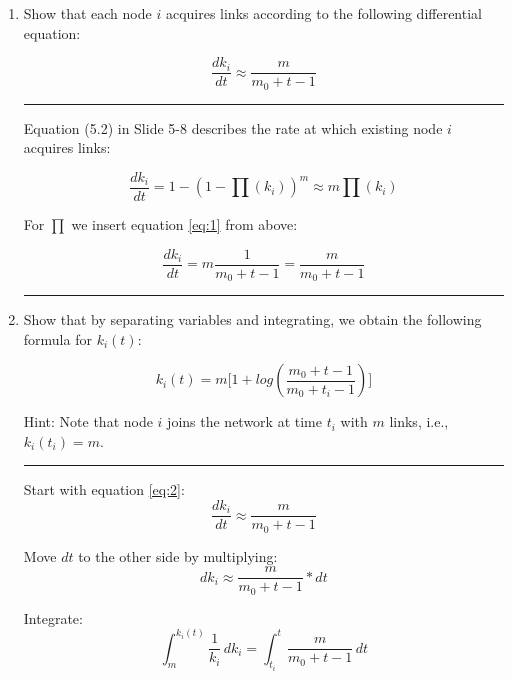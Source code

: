 \begin{enumerate}
	\item Show that each node $i$ acquires links according to the following differential equation:
	
	\begin{equation}  \label{eq:2}
		\frac{dk_i}{dt} \approx \frac{m}{m_0 + t - 1}
	\end{equation}
	
	\hrule \relax
	
	Equation (5.2) in Slide 5-8 describes the rate at which existing node $i$ acquires links:
	
	\begin{equation}
		\frac{dk_i}{dt} = 1 - (1 - \prod(k_i))^m \approx m \prod(k_i)
	\end{equation}
	
	For $\prod$ we insert equation \ref{eq:1} from above:
	
	\begin{equation}
		\frac{dk_i}{dt} = m \frac{1}{m_0 + t - 1} = \frac{m}{m_0 + t - 1}
	\end{equation}
	
	\hrule \relax
	
	\item Show that by separating variables and integrating, we obtain the following formula for $k_i(t)$:
	
	\begin{equation} \label{eq:3}
		k_i(t) = m \biggl[1 + log(\frac{m_0 + t - 1}{m_0 + t_i - 1}) \biggr]
	\end{equation}
	
	Hint: Note that node $i$ joins the network at time $t_i$ with $m$ links, i.e., $k_i(t_i) = m$.
	
	\hrule \relax
	
	Start with equation \ref{eq:2}:
	\begin{equation*}
		\frac{dk_i}{dt} \approx \frac{m}{m_0 + t - 1}
	\end{equation*}
	
	Move $dt$ to the other side by multiplying:
	\begin{equation*}
		dk_i \approx \frac{m}{m_0 + t - 1} * dt
	\end{equation*}
	
	Integrate:
	\begin{equation*}
		\int_{m}^{k_i(t)} \frac{1}{k_i} \,dk_i = \int_{t_i}^{t} \frac{m}{m_0 + t - 1} \,dt
	\end{equation*}
	

\end{enumerate}
